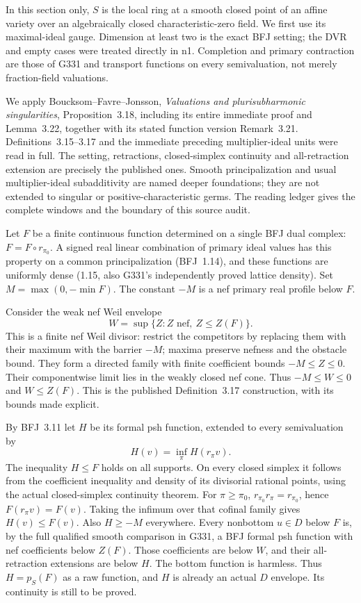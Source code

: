 \documentclass[11pt]{article}
\begin{document}
In this section only, $S$ is the local ring at a smooth closed point of an affine variety over an algebraically closed characteristic-zero field. We first use its maximal-ideal gauge. Dimension at least two is the exact BFJ setting; the DVR and empty cases were treated directly in n1. Completion and primary contraction are those of G331 and transport functions on every semivaluation, not merely fraction-field valuations.

We apply Boucksom--Favre--Jonsson, \emph{Valuations and plurisubharmonic singularities}, Proposition~3.18, including its entire immediate proof and Lemma~3.22, together with its stated function version Remark~3.21. Definitions~3.15--3.17 and the immediate preceding multiplier-ideal units were read in full. The setting, retractions, closed-simplex continuity and all-retraction extension are precisely the published ones. Smooth principalization and usual multiplier-ideal subadditivity are named deeper foundations; they are not extended to singular or positive-characteristic germs. The reading ledger gives the complete windows and the boundary of this source audit.

Let $F$ be a finite continuous function determined on a single BFJ dual complex: $F=F\circ r_{\pi_0}$. A signed real linear combination of primary ideal values has this property on a common principalization (BFJ~1.14), and these functions are uniformly dense (1.15, also G331's independently proved lattice density). Set $M=\max(0,-\min F)$. The constant $-M$ is a nef primary real profile below $F$.

Consider the weak nef Weil envelope
\[
 W=\sup\{Z:Z\text{ nef},\ Z\le Z(F)\}.
\]
This is a finite nef Weil divisor: restrict the competitors by replacing them with their maximum with the barrier $-M$; maxima preserve nefness and the obstacle bound. They form a directed family with finite coefficient bounds $-M\le Z\le0$. Their componentwise limit lies in the weakly closed nef cone. Thus $-M\le W\le0$ and $W\le Z(F)$. This is the published Definition~3.17 construction, with its bounds made explicit.

By BFJ~3.11 let $H$ be its formal psh function, extended to every semivaluation by
\[
 H(v)=\inf_{\pi}H(r_\pi v).
\]
The inequality $H\le F$ holds on all supports. On every closed simplex it follows from the coefficient inequality and density of its divisorial rational points, using the actual closed-simplex continuity theorem. For $\pi\ge\pi_0$, $r_{\pi_0}r_\pi=r_{\pi_0}$, hence $F(r_\pi v)=F(v)$. Taking the infimum over that cofinal family gives $H(v)\le F(v)$. Also $H\ge-M$ everywhere. Every nonbottom $u\in D$ below $F$ is, by the full qualified smooth comparison in G331, a BFJ formal psh function with nef coefficients below $Z(F)$. Those coefficients are below $W$, and their all-retraction extensions are below $H$. The bottom function is harmless. Thus $H=p_S(F)$ as a raw function, and $H$ is already an actual $D$ envelope. Its continuity is still to be proved.
\end{document}
